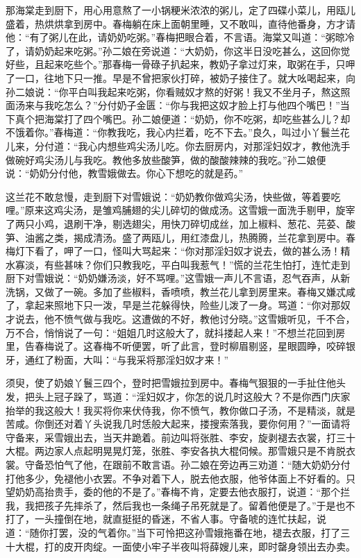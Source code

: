 那海棠走到厨下，用心用意熬了一小锅粳米浓浓的粥儿，定了四碟小菜儿，用瓯儿盛着，热烘烘拿到房中。春梅躺在床上面朝里睡，又不敢叫，直待他番身，方才请他：“有了粥儿在此，请奶奶吃粥。”春梅把眼合着，不言语。海棠又叫道：“粥晾冷了，请奶奶起来吃粥。”孙二娘在旁说道：“大奶奶，你这半日没吃甚么，这回你觉好些，且起来吃些个。”那春梅一骨碌子扒起来，教奶子拿过灯来，取粥在手，只呷了一口，往地下只一推。早是不曾把家伙打碎，被奶子接住了。就大吆喝起来，向孙二娘说：“你平白叫我起来吃粥，你看贼奴才熬的好粥！我又不坐月子，熬这照面汤来与我吃怎么？”分付奶子金匮：“你与我把这奴才脸上打与他四个嘴巴！”当下真个把海棠打了四个嘴巴。孙二娘便道：“奶奶，你不吃粥，却吃些甚么儿？却不饿着你。”春梅道：“你教我吃，我心内拦着，吃不下去。”良久，叫过小丫鬟兰花儿来，分付道：“我心内想些鸡尖汤儿吃。你去厨房内，对那淫妇奴才，教他洗手做碗好鸡尖汤儿与我吃。教他多放些酸笋，做的酸酸辣辣的我吃。”孙二娘便说：“奶奶分付他，教雪娥做去。你心下想吃的就是药。”

这兰花不敢怠慢，走到厨下对雪娥说：“奶奶教你做鸡尖汤，快些做，等着要吃哩。”原来这鸡尖汤，是雏鸡脯翅的尖儿碎切的做成汤。这雪娥一面洗手剔甲，旋宰了两只小鸡，退刷干净，剔选翅尖，用快刀碎切成丝，加上椒料、葱花、芫荽、酸笋、油酱之类，揭成清汤。盛了两瓯儿，用红漆盘儿，热腾腾，兰花拿到房中。春梅灯下看了，呷了一口，怪叫大骂起来：“你对那淫妇奴才说去，做的甚么汤！精水寡淡，有些甚味？你们只教我吃，平白叫我惹气！”慌的兰花生怕打，连忙走到厨下对雪娥说：“奶奶嫌汤淡，好不骂哩。”这雪娥一声儿不言语，忍气吞声，从新洗锅，又做了一碗。多加了些椒料，香喷喷，教兰花儿拿到房里来。春梅又嫌忒咸了，拿起来照地下只一泼，早是兰花躲得快，险些儿泼了一身。骂道：“你对那奴才说去，他不愤气做与我吃。这遭做的不好，教他讨分晓。”这雪娥听见，千不合，万不合，悄悄说了一句：“姐姐几时这般大了，就抖搂起人来！”不想兰花回到房里，告春梅说了。这春梅不听便罢，听了此言，登时柳眉剔竖，星眼圆睁，咬碎银牙，通红了粉面，大叫：“与我采将那淫妇奴才来！”

须臾，使了奶娘丫鬟三四个，登时把雪娥拉到房中。春梅气狠狠的一手扯住他头发，把头上冠子跺了，骂道：“淫妇奴才，你怎的说几时这般大？不是你西门庆家抬举的我这般大！我买将你来伏侍我，你不愤气，教你做口子汤，不是精淡，就是苦咸。你倒还对着丫头说我几时恁般大起来，搂搜索落我，要你何用？”一面请将守备来，采雪娥出去，当天井跪着。前边叫将张胜、李安，旋剥褪去衣裳，打三十大棍。两边家人点起明晃晃灯笼，张胜、李安各执大棍伺候。那雪娥只是不肯脱衣裳。守备恐怕气了他，在跟前不敢言语。孙二娘在旁边再三劝道：“随大奶奶分付打他多少，免褪他小衣罢。不争对着下人，脱去他衣服，他爷体面上不好看的。只望奶奶高抬贵手，委的他的不是了。”春梅不肯，定要去他衣服打，说道：“那个拦我，我把孩子先摔杀了，然后我也一条绳子吊死就是了。留着他便是了。”于是也不打了，一头撞倒在地，就直挺挺的昏迷，不省人事。守备唬的连忙扶起，说道：“随你打罢，没的气着你。”当下可怜把这孙雪娥拖番在地，褪去衣服，打了三十大棍，打的皮开肉绽。一面使小牢子半夜叫将薛嫂儿来，即时罄身领出去办卖。

